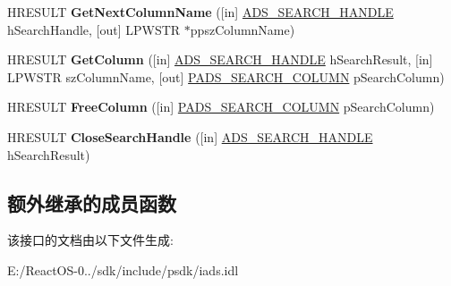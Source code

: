 \begin{DoxyCompactItemize}
\item 
\mbox{\label{interface_i_directory_search_a2e11115487a036d965333c59438b153e}} 
H\+R\+E\+S\+U\+LT {\bfseries Get\+Next\+Column\+Name} (\mbox{[}in\mbox{]} \hyperlink{interfacevoid}{A\+D\+S\+\_\+\+S\+E\+A\+R\+C\+H\+\_\+\+H\+A\+N\+D\+LE} h\+Search\+Handle, \mbox{[}out\mbox{]} L\+P\+W\+S\+TR $\ast$ppsz\+Column\+Name)
\item 
\mbox{\label{interface_i_directory_search_a7bd06cde7b88aa2dcceeed479a0fd7c4}} 
H\+R\+E\+S\+U\+LT {\bfseries Get\+Column} (\mbox{[}in\mbox{]} \hyperlink{interfacevoid}{A\+D\+S\+\_\+\+S\+E\+A\+R\+C\+H\+\_\+\+H\+A\+N\+D\+LE} h\+Search\+Result, \mbox{[}in\mbox{]} L\+P\+W\+S\+TR sz\+Column\+Name, \mbox{[}out\mbox{]} \hyperlink{structads__search__column}{P\+A\+D\+S\+\_\+\+S\+E\+A\+R\+C\+H\+\_\+\+C\+O\+L\+U\+MN} p\+Search\+Column)
\item 
\mbox{\label{interface_i_directory_search_ada37788c58a80b6955939957c83ee099}} 
H\+R\+E\+S\+U\+LT {\bfseries Free\+Column} (\mbox{[}in\mbox{]} \hyperlink{structads__search__column}{P\+A\+D\+S\+\_\+\+S\+E\+A\+R\+C\+H\+\_\+\+C\+O\+L\+U\+MN} p\+Search\+Column)
\item 
\mbox{\label{interface_i_directory_search_acaccf0a3c31662b64e0dec525832d1ea}} 
H\+R\+E\+S\+U\+LT {\bfseries Close\+Search\+Handle} (\mbox{[}in\mbox{]} \hyperlink{interfacevoid}{A\+D\+S\+\_\+\+S\+E\+A\+R\+C\+H\+\_\+\+H\+A\+N\+D\+LE} h\+Search\+Result)
\end{DoxyCompactItemize}
\subsection*{额外继承的成员函数}


该接口的文档由以下文件生成\+:\begin{DoxyCompactItemize}
\item 
E\+:/\+React\+O\+S-\/0../sdk/include/psdk/iads.\+idl\end{DoxyCompactItemize}
